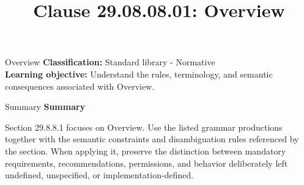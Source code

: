 \documentclass[10pt,letterpaper]{article}
\title{Clause 29.08.08.01: Overview}
\author{}
\date{}
\begin{document}
\maketitle
\begin{CornellOverviewBox}{Overview}
\textbf{Classification:} Standard library - Normative\\[2pt]
\textbf{Learning objective:} Understand the rules, terminology, and semantic consequences associated with Overview.
\end{CornellOverviewBox}\begin{CornellSummaryBox}{Summary}
{\sffamily\bfseries\color{Accent} Summary}\par\vspace{3pt}Section 29.8.8.1 focuses on Overview. Use the listed grammar productions together with the semantic constraints and disambiguation rules referenced by the section. When applying it, preserve the distinction between mandatory requirements, recommendations, permissions, and behavior deliberately left undefined, unspecified, or implementation-defined.
\end{CornellSummaryBox}
\end{document}
